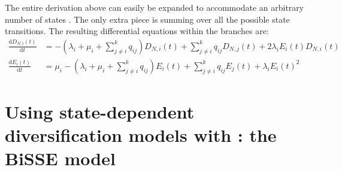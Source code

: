 The entire derivation above can easily be expanded to accommodate an arbitrary number of states \citep{FitzJohn2012}.
The only extra piece is summing over all the possible state transitions.
%
%
The resulting differential equations within the branches are:
\begin{align*}
    \frac{\mathrm{d}D_{N,i}(t)}{\mathrm{d}t} &= - \left(\lambda_i + \mu_i + \sum\limits_{j \neq i}^k q_{ij} \right)D_{N,i}(t) + \sum\limits_{j \neq i}^k q_{ij} D_{N,j}(t) + 2\lambda_iE_i(t)D_{N,i}(t) \\
    \frac{\mathrm{d}E_i(t)}{\mathrm{d}t} &= \mu_i - \left(\lambda_i + \mu_i + \sum\limits_{j \neq i}^k q_{ij} \right)E_i(t) + \sum\limits_{j \neq i}^k q_{ij} E_j(t) + \lambda_i E_i(t)^2
\end{align*}

\newpage

\section{Using state-dependent diversification models with \RevBayes: the BiSSE model} \label{sec:CDBDP}

